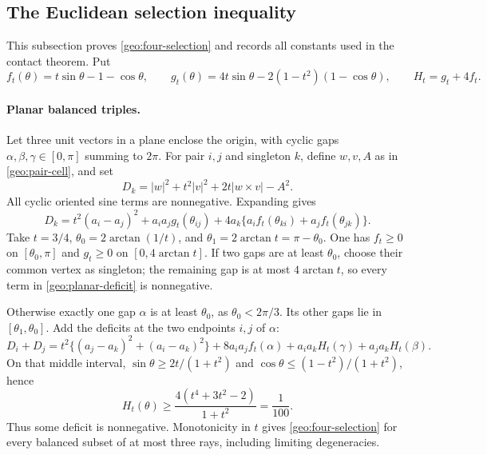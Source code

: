 \subsection{The Euclidean selection inequality}
\label{geo:angles}

This subsection proves \eqref{geo:four-selection} and records all
constants used in the contact theorem. Put
\[
 f_t(\theta)=t\sin\theta-1-\cos\theta,\qquad
 g_t(\theta)=4t\sin\theta-2(1-t^2)(1-\cos\theta),\qquad
 H_t=g_t+4f_t.
\]

\paragraph{Planar balanced triples.}
Let three unit vectors in a plane enclose the origin, with cyclic gaps
\(\alpha,\beta,\gamma\in[0,\pi]\) summing to \(2\pi\).
For pair \(i,j\) and singleton \(k\), define \(w,v,A\) as in
\eqref{geo:pair-cell}, and set
\[
 D_k=|w|^2+t^2|v|^2+2t|w\times v|-A^2.
\]
All cyclic oriented sine terms are nonnegative. Expanding gives
\begin{equation}
 D_k=t^2(a_i-a_j)^2+a_ia_jg_t(\theta_{ij})
 +4a_k\{a_if_t(\theta_{ki})+a_jf_t(\theta_{jk})\}.
 \label{geo:planar-deficit}
\end{equation}
Take \(t=3/4\), \(\theta_0=2\arctan(1/t)\), and
\(\theta_1=2\arctan t=\pi-\theta_0\).
One has \(f_t\ge0\) on \([\theta_0,\pi]\) and
\(g_t\ge0\) on \([0,4\arctan t]\).
If two gaps are at least \(\theta_0\), choose their common vertex as
singleton; the remaining gap is at most \(4\arctan t\), so every
term in \eqref{geo:planar-deficit} is nonnegative.

Otherwise exactly one gap \(\alpha\) is at least \(\theta_0\), as
\(\theta_0<2\pi/3\). Its other gaps lie in
\([\theta_1,\theta_0]\). Add the deficits at the two endpoints \(i,j\)
of \(\alpha\):
\[
 D_i+D_j=t^2\{(a_j-a_k)^2+(a_i-a_k)^2\}
 +8a_ia_jf_t(\alpha)+a_ia_kH_t(\gamma)+a_ja_kH_t(\beta).
\]
On that middle interval,
\(\sin\theta\ge2t/(1+t^2)\) and
\(\cos\theta\le(1-t^2)/(1+t^2)\), hence
\[
 H_t(\theta)\ge
 \frac{4(t^4+3t^2-2)}{1+t^2}=\frac1{100}.
\]
Thus some deficit is nonnegative. Monotonicity in \(t\) gives
\eqref{geo:four-selection} for every balanced subset of at most
three rays, including limiting degeneracies.


